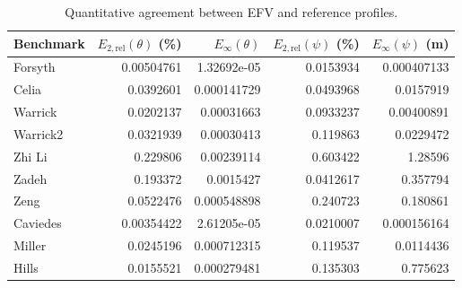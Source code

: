\begin{table}
\centering
\caption{Quantitative agreement between EFV and reference profiles.}
\label{tab:profile-agreement}
\begin{tabular}{lrrrr}
\toprule
Benchmark & $E_{2,\mathrm{rel}}(\theta)$ (\%) & $E_{\infty}(\theta)$ & $E_{2,\mathrm{rel}}(\psi)$ (\%) & $E_{\infty}(\psi)$ (m) \\
\midrule
Forsyth & 0.00504761 & 1.32692e-05 & 0.0153934 & 0.000407133 \\
Celia & 0.0392601 & 0.000141729 & 0.0493968 & 0.0157919 \\
Warrick & 0.0202137 & 0.00031663 & 0.0933237 & 0.00400891 \\
Warrick2 & 0.0321939 & 0.00030413 & 0.119863 & 0.0229472 \\
Zhi Li & 0.229806 & 0.00239114 & 0.603422 & 1.28596 \\
Zadeh & 0.193372 & 0.0015427 & 0.0412617 & 0.357794 \\
Zeng & 0.0522476 & 0.000548898 & 0.240723 & 0.180861 \\
Caviedes & 0.00354422 & 2.61205e-05 & 0.0210007 & 0.000156164 \\
Miller & 0.0245196 & 0.000712315 & 0.119537 & 0.0114436 \\
Hills & 0.0155521 & 0.000279481 & 0.135303 & 0.775623 \\
\bottomrule
\end{tabular}
\end{table}
